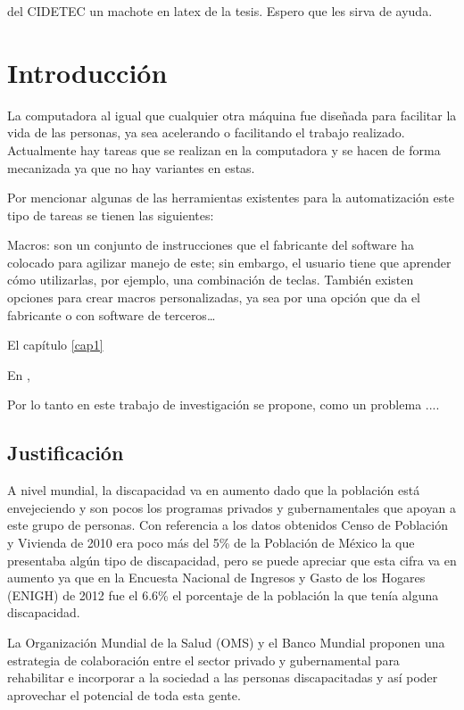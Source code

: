del CIDETEC un machote en latex de la tesis. Espero que les sirva de ayuda.
\chapter{Introducción \label{cap1}}

La computadora al igual que cualquier otra máquina fue diseñada para facilitar
la vida de las personas, ya sea acelerando o facilitando el trabajo realizado.
Actualmente hay tareas que se realizan en la computadora y se hacen de forma
mecanizada ya que no hay variantes en estas. 

Por mencionar algunas de las herramientas existentes  para la automatización
este tipo de tareas se tienen las siguientes:

Macros: son un conjunto de instrucciones que el fabricante del software ha
colocado para agilizar manejo de este; sin embargo, el usuario tiene  que
aprender cómo utilizarlas, por ejemplo, una combinación de teclas. También
existen opciones para crear macros personalizadas, ya sea por una opción que
da el fabricante o con software de terceros…

El capítulo \ref{cap1} 

En \cite{RolandSiegwart+IllanNourbakhsh},


Por lo tanto en este trabajo de investigación se propone, como un problema ....


\section{Justificación}
A nivel mundial, la discapacidad va en aumento dado que la población está
envejeciendo y son pocos los programas privados y gubernamentales que apoyan a
este grupo de personas. Con referencia a los datos obtenidos Censo de Población
 y Vivienda de 2010 era poco más del 5\% de la Población de México la que
 presentaba algún tipo de discapacidad, pero se puede apreciar que esta cifra va
 en aumento ya que en la Encuesta Nacional de Ingresos y Gasto de los Hogares
 (ENIGH) de 2012 fue el 6.6\% el porcentaje de la población la que tenía alguna
 discapacidad.
 
 
La Organización Mundial de la Salud (OMS) y el Banco Mundial proponen una
 estrategia de colaboración entre el sector privado y gubernamental para
 rehabilitar e incorporar a la sociedad a las personas discapacitadas y así
 poder aprovechar el potencial de toda esta gente.
 
